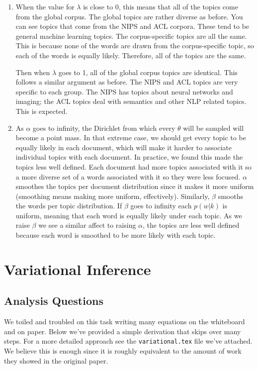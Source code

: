 \documentclass[11pt,a4paper]{article}
\begin{document}
\begin{enumerate}
\begin{enumerate}
			\item 
			
			When the value for $\lambda$ is close to 0, this means that all of
			the topics come from the global corpus. The global topics are rather
			diverse as before. You can see topics that come from the NIPS
			and ACL corpora. These tend to be general machine learning topics.
			The corpus-specific topics are all the same. This is because none
			of the words are drawn from the corpus-specific topic, so each  of
			the words is equally likely. Therefore, all of the topics are the same.
			
			Then when $\lambda$ goes to 1, all of the global corpus topics
			are identical. This follows a similar argument as before. The NIPS
			and ACL topics are very specific to each group. The NIPS has topics
			about neural networks and imaging; the ACL topics deal with
			semantics and other NLP related topics. This is expected.
			
			\item As $\alpha$ goes to infinity, the Dirichlet from which every $\theta$ 
			will be sampled will become a point mass.
			In that extreme case, we should get
			every topic to be equally likely in each document, which will make it
			harder to associate individual topics with each document. In practice, we found this made the topics less well defined. Each document had more topics associated with it so a more diverse set of a words associated with it so they were less focused. $\alpha$ smoothes the topics per document distribution since it makes it more uniform (smoothing means making more uniform, effectively). Similarly, $\beta$ smooths the words per topic distribution. If $\beta$ goes to infinity each $p(w|k)$ is uniform, meaning that each word is equally likely under each topic. As we raise $\beta$ we see a similar affect to raising $\alpha$, the topics are less well defined because each word is smoothed to be more likely with each topic.
		\end{enumerate}
	\end{enumerate}
	
	\section{Variational Inference}
	\subsection{Analysis Questions}
	
	We toiled and troubled on this task writing many equations on the whiteboard and on paper. Below we've provided a simple derivation that skips over many steps. For a more detailed approach see the \texttt{variational.tex} file we've attached. We believe this is enough since it is roughly equivalent to the amount of work they showed in the original paper.
\\ \\
\end{document}

